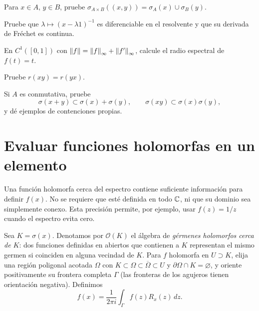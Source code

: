 \begin{ejercicio}\label{ej:v3-l22-2}
Para $x\in A$, $y\in B$, pruebe $\sigma_{A\times B}((x,y))=\sigma_A(x)\cup\sigma_B(y)$.
\end{ejercicio}


\begin{ejercicio}\label{ej:v3-l22-3}
Pruebe que $\lambda\mapsto(x-\lambda1)^{-1}$ es diferenciable en el resolvente y que su derivada de Fréchet es continua.
\end{ejercicio}


\begin{ejercicio}\label{ej:v3-l22-4}
En $C^1([0,1])$ con $\left\lVert f\right\rVert=\left\lVert f\right\rVert_\infty+\left\lVert f'\right\rVert_\infty$, calcule el radio espectral de $f(t)=t$.
\end{ejercicio}


\begin{ejercicio}\label{ej:v3-l22-5}
Pruebe $r(xy)=r(yx)$.
\end{ejercicio}


\begin{ejercicio}\label{ej:v3-l22-6}
Si $A$ es conmutativa, pruebe
\[
 \sigma(x+y)\subset\sigma(x)+\sigma(y),\qquad
 \sigma(xy)\subset\sigma(x)\sigma(y),
\]
y dé ejemplos de contenciones propias.
\end{ejercicio}


\section{Evaluar funciones holomorfas en un elemento}\label{lec:v3-23}

Una función holomorfa cerca del espectro contiene suficiente información para definir $f(x)$. No se requiere que esté definida en todo $\mathbb C$, ni que su dominio sea simplemente conexo. Esta precisión permite, por ejemplo, usar $f(z)=1/z$ cuando el espectro evita cero.

\begin{definicion}
Sea $K=\sigma(x)$. Denotamos por $\mathcal O(K)$ el álgebra de \emph{gérmenes holomorfos cerca de $K$}: dos funciones definidas en abiertos que contienen a $K$ representan el mismo germen si coinciden en alguna vecindad de $K$. Para $f$ holomorfa en $U\supset K$, elija una región poligonal acotada $\Omega$ con
$K\subset\Omega\subset\overline\Omega\subset U$ y $\partial\Omega\cap K=\varnothing$, y oriente positivamente su frontera completa $\Gamma$ (las fronteras de los agujeros tienen orientación negativa). Definimos
\[
 f(x)=\frac1{2\pi i}\int_\Gamma f(z)R_x(z)\,dz.
\]
\end{definicion}

